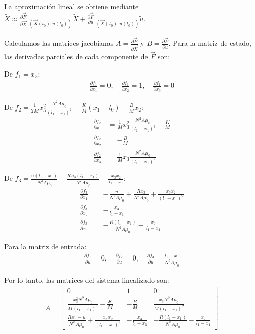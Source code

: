 \documentclass[
  11pt,
  letterpaper,
   addpoints,
   answers
  ]{exam}
\begin{document}
\begin{solution}
La aproximación lineal se obtiene mediante $\dot{\tilde{X}} \approx \frac{\partial \vec{F}}{\partial \vec{X}}\Big|_{(\vec{X}(t_0), u(t_0))} \tilde{X} + \frac{\partial \vec{F}}{\partial u}\Big|_{(\vec{X}(t_0), u(t_0))} \tilde{u}$.

Calculamos las matrices jacobianas $A = \frac{\partial \vec{F}}{\partial \vec{X}}$ y $B = \frac{\partial \vec{F}}{\partial u}$. Para la matriz de estado, las derivadas parciales de cada componente de $\vec{F}$ son:

De $f_1 = x_2$:
\begin{align}
\frac{\partial f_1}{\partial x_1} = 0, \quad \frac{\partial f_1}{\partial x_2} = 1, \quad \frac{\partial f_1}{\partial x_3} = 0
\end{align}

De $f_2 = \frac{1}{2M} x_3^2 \frac{N^2 A \mu_0}{(l_1 - x_1)^2} - \frac{K}{M}(x_1 - l_0) - \frac{B}{M} x_2$:
\begin{align}
\frac{\partial f_2}{\partial x_1} &= \frac{1}{M} x_3^2 \frac{N^2 A \mu_0}{(l_1 - x_1)^3} - \frac{K}{M}\\
\frac{\partial f_2}{\partial x_2} &= -\frac{B}{M}\\
\frac{\partial f_2}{\partial x_3} &= \frac{1}{M} x_3 \frac{N^2 A \mu_0}{(l_1 - x_1)^2}
\end{align}

De $f_3 = \frac{u(l_1 - x_1)}{N^2 A \mu_0} - \frac{R x_3 (l_1 - x_1)}{N^2 A \mu_0} - \frac{x_3 x_2}{l_1 - x_1}$:
\begin{align}
\frac{\partial f_3}{\partial x_1} &= -\frac{u}{N^2 A \mu_0} + \frac{R x_3}{N^2 A \mu_0} + \frac{x_3 x_2}{(l_1 - x_1)^2}\\
\frac{\partial f_3}{\partial x_2} &= -\frac{x_3}{l_1 - x_1}\\
\frac{\partial f_3}{\partial x_3} &= -\frac{R(l_1 - x_1)}{N^2 A \mu_0} - \frac{x_2}{l_1 - x_1}
\end{align}

Para la matriz de entrada:
\begin{align}
\frac{\partial f_1}{\partial u} = 0, \quad \frac{\partial f_2}{\partial u} = 0, \quad \frac{\partial f_3}{\partial u} = \frac{l_1 - x_1}{N^2 A \mu_0}
\end{align}

Por lo tanto, las matrices del sistema linealizado son:
\begin{align}
A = \begin{bmatrix}
0 & 1 & 0 \\[4pt]
\displaystyle \frac{x_3^2 N^2 A \mu_0}{M(l_1 - x_1)^3} - \frac{K}{M} & -\frac{B}{M} & \displaystyle \frac{x_3 N^2 A \mu_0}{M(l_1 - x_1)^2} \\[8pt]
\displaystyle \frac{R x_3 - u}{N^2 A \mu_0} + \frac{x_3 x_2}{(l_1 - x_1)^2} & -\frac{x_3}{l_1 - x_1} & -\frac{R(l_1 - x_1)}{N^2 A \mu_0} - \frac{x_2}{l_1 - x_1}
\end{bmatrix}
\end{align}


\end{solution}
\end{document}
